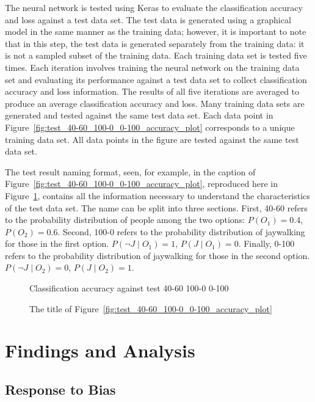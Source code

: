 \documentclass{report}
\begin{document}
The neural network is tested using Keras to evaluate the classification accuracy and loss against a
test data set. The test data is generated using a graphical model in the same manner as the training
data; however, it is important to note that in this step, the test data is generated separately from
the training data: it is not a sampled subset of the training data. Each training data set is tested
five times. Each iteration involves training the neural network on the training data set and
evaluating its performance against a test data set to collect classification accuracy and loss
information. The results of all five iterations are averaged to produce an average classification
accuracy and loss. Many training data sets are generated and tested against the same test data set.
Each data point in Figure~\ref{fig:test_40-60_100-0_0-100_accuracy_plot} corresponds to a unique
training data set. All data points in the figure are tested against the same test data set.

The test result naming format, seen, for example, in the caption of
Figure~\ref{fig:test_40-60_100-0_0-100_accuracy_plot}, reproduced here in
Figure~\ref{fig:test_result_naming_example}, contains all the information necessary to understand
the characteristics of the test data set. The name can be split into three sections. First, 40-60
refers to the probability distribution of people among the two options: $P(O_1) = 0.4$, $P(O_2) =
0.6$. Second, 100-0 refers to the probability distribution of jaywalking for those in the first
option. $P(\neg J \mid O_1) = 1$, $P(J \mid O_1) = 0$. Finally, 0-100 refers to the probability
distribution of jaywalking for those in the second option. $P(\neg J \mid O_2) = 0$, $P(J \mid O_2)
= 1$.

\begin{figure}[h]
    \centering
    Classification accuracy against test 40-60 100-0 0-100
    \caption{The title of Figure~\ref{fig:test_40-60_100-0_0-100_accuracy_plot}}
    \label{fig:test_result_naming_example}
\end{figure}

\FloatBarrier
\chapter{Findings and Analysis}

\section{Response to Bias}
\end{document}
